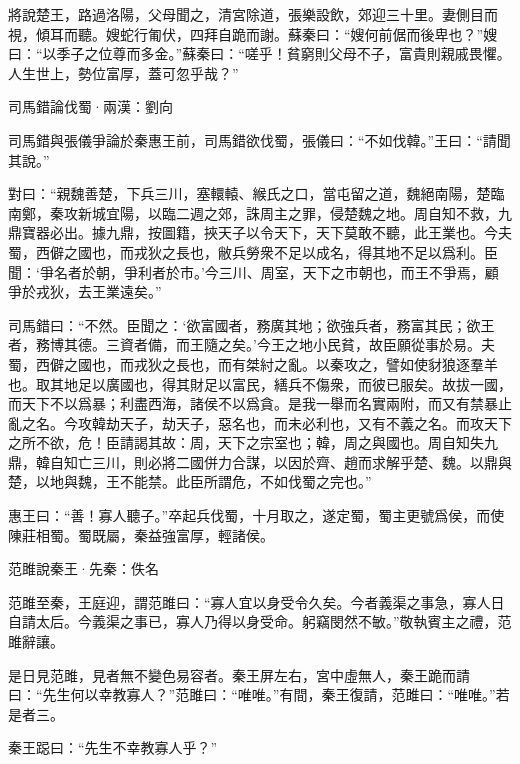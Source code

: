 \documentclass[12pt,a4paper]{ctexbook}
\begin{document}
將說楚王，路過洛陽，父母聞之，清宮除道，張樂設飲，郊迎三十里。妻側目而視，傾耳而聽。嫂蛇行匍伏，四拜自跪而謝。蘇秦曰：“嫂何前倨而後卑也？”嫂曰：“以季子之位尊而多金。”蘇秦曰：“嗟乎！貧窮則父母不子，富貴則親戚畏懼。人生世上，勢位富厚，蓋可忽乎哉？”\par
司馬錯論伐蜀·兩漢：劉向 \par
司馬錯與張儀爭論於秦惠王前，司馬錯欲伐蜀，張儀曰：“不如伐韓。”王曰：“請聞其說。”\par
對曰：“親魏善楚，下兵三川，塞轘轅、緱氏之口，當屯留之道，魏絕南陽，楚臨南鄭，秦攻新城宜陽，以臨二週之郊，誅周主之罪，侵楚魏之地。周自知不救，九鼎寶器必出。據九鼎，按圖籍，挾天子以令天下，天下莫敢不聽，此王業也。今夫蜀，西僻之國也，而戎狄之長也，敝兵勞衆不足以成名，得其地不足以爲利。臣聞：‘爭名者於朝，爭利者於市。’今三川、周室，天下之市朝也，而王不爭焉，顧爭於戎狄，去王業遠矣。”\par
司馬錯曰：“不然。臣聞之：‘欲富國者，務廣其地；欲強兵者，務富其民；欲王者，務博其德。三資者備，而王隨之矣。’今王之地小民貧，故臣願從事於易。夫蜀，西僻之國也，而戎狄之長也，而有桀紂之亂。以秦攻之，譬如使豺狼逐羣羊也。取其地足以廣國也，得其財足以富民，繕兵不傷衆，而彼已服矣。故拔一國，而天下不以爲暴；利盡西海，諸侯不以爲貪。是我一舉而名實兩附，而又有禁暴止亂之名。今攻韓劫天子，劫天子，惡名也，而未必利也，又有不義之名。而攻天下之所不欲，危！臣請謁其故：周，天下之宗室也；韓，周之與國也。周自知失九鼎，韓自知亡三川，則必將二國併力合謀，以因於齊、趙而求解乎楚、魏。以鼎與楚，以地與魏，王不能禁。此臣所謂危，不如伐蜀之完也。”\par
惠王曰：“善！寡人聽子。”卒起兵伐蜀，十月取之，遂定蜀，蜀主更號爲侯，而使陳莊相蜀。蜀既屬，秦益強富厚，輕諸侯。\par
范雎說秦王·先秦：佚名 \par
范雎至秦，王庭迎，謂范雎曰：“寡人宜以身受令久矣。今者義渠之事急，寡人日自請太后。今義渠之事已，寡人乃得以身受命。躬竊閔然不敏。”敬執賓主之禮，范雎辭讓。\par
是日見范雎，見者無不變色易容者。秦王屏左右，宮中虛無人，秦王跪而請曰：“先生何以幸教寡人？”范雎曰：“唯唯。”有間，秦王復請，范雎曰：“唯唯。”若是者三。\par
秦王跽曰：“先生不幸教寡人乎？”\par
\end{document}
